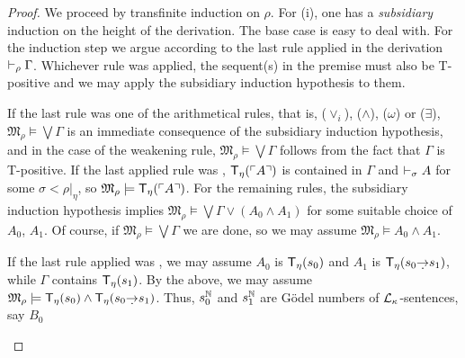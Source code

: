 \documentclass[UKenglish,cleveref,DIV=12]{scrartcl}
\theoremstyle{definition}
\theoremstyle{definition}
\begin{document}
\begin{proof}
We proceed by transfinite induction on $\rho$. For (i), one has a \emph{
subsidiary} induction on the height of the derivation. The base case is easy to
deal with. For the induction step we argue according to the last rule applied in
the derivation $\vdash_\rho \Gamma$. Whichever rule was applied, the sequent(s) in the premise must also be T-positive and we may apply the subsidiary induction hypothesis to them.

If the last rule was one of the arithmetical rules, that is, ($\lor_i$),
($\land$), ($\omega$) or ($\exists$),
$\mathfrak{M}_\rho\models\bigvee\Gamma$ is an immediate consequence of the
subsidiary induction hypothesis, and in the case of the weakening rule,
$\mathfrak{M}_\rho\models\bigvee\Gamma$ follows from the fact that $\Gamma$ is
T-positive. If the last applied rule was \Nec\eta, $\mathsf{T}_\eta(\ulcorner{A}\urcorner)$ is
contained in $\Gamma$ and $\vdash_\sigma  A$ for some %
$\sigma<\rho|_\eta$, so $\mathfrak{M}_\rho\models \mathsf{T}_\eta(\ulcorner{A}\urcorner)$.
For the remaining rules, the subsidiary induction hypothesis implies
$\mathfrak{M}_\rho\models\bigvee\Gamma\lor(A_0\land A_1)$ for some suitable
choice of $A_0$, $A_1$.
Of course, if
$\mathfrak{M}_\rho\models\bigvee\Gamma$ we are done, so we may assume
$\mathfrak{M}_\rho\models A_0\land A_1$.
\begin{description}\renewcommand*\labelitemi{--}%
\item [\normalfont{}\Imp\eta.] If the last rule applied was \Imp\eta, we may
  assume $A_0$ is $\mathsf{T}_\eta(s_0)$ and $A_1$ is $\T_\eta(s_0\dimplies s_1)$, while
  $\Gamma$ contains $\mathsf{T}_\eta(s_1)$. By the above, we may assume
  $\mathfrak{M}_\rho\models \T_\eta(s_0)\land \T_\eta(s_0\dimplies s_1)$. Thus,
  $s_0^\mathbb N$ and $s_1^\mathbb N$ are Gödel numbers of $\mathcal{L}_\kappa$-sentences, say $B_0$

\end{description}
\end{proof}
\end{document}
